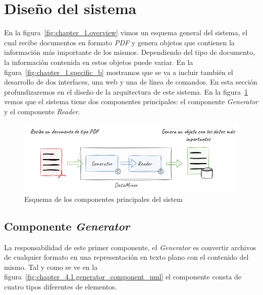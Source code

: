 \section{Diseño del sistema}\label{sec:diseno_del_sistema}

En la figura~\ref{fig:chapter_1.overview} vimos un esquema general del sistema, el cual recibe documentos en formato
\textit{PDF} y genera objetos que contienen la información más importante de los mismos.
Dependiendo del tipo de documento, la información contenida en estos objetos puede variar.
En la figura~\ref{fig:chapter_1.specific_b} mostramos que se va a incluir también el desarrollo de dos interfaces, una
web y una de línea de comandos.
En esta sección profundizaremos en el diseño de la arquitectura de este sistema.
En la figura~\ref{fig:chapter_4.1.overview} vemos que el sistema tiene dos componentes principales: el componente
\textit{Generator} y el componente \textit{Reader}.

\begin{figure}[ht]
    \begin{center}
        \includegraphics[width=\textwidth]{./chapter/4/images/chapter_4.1.overview}
        \caption{Esquema de los componentes principales del sistem}
        \label{fig:chapter_4.1.overview}
    \end{center}
\end{figure}

\subsection*{Componente \textit{Generator}}\label{subsec:chapter_4.generator_component}

La responsabilidad de este primer componente, el \textit{Generator} es convertir archivos de cualquier formato en una
representación en texto plano con el contenido del mismo.
Tal y como se ve en la figura~\ref{fig:chapter_4.1.generator_component_uml} el componente consta de cuatro tipos
diferentes de elementos.

